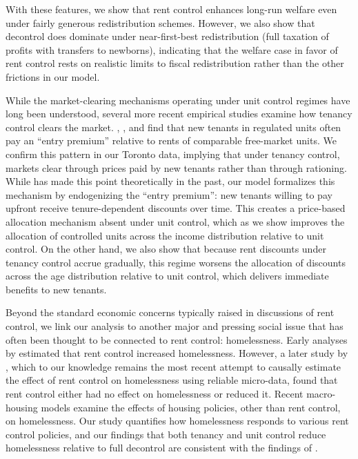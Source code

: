 \documentclass[parskip=full]{article}
\begin{document}
With these features, we show that rent control enhances long-run welfare even under fairly generous redistribution schemes. However, we also show that decontrol does dominate under near-first-best redistribution (full taxation of profits with transfers to newborns), indicating that the welfare case in favor of rent control rests on realistic limits to fiscal redistribution rather than the other frictions in our model.

While the market-clearing mechanisms operating under unit control regimes have long been understood, several more recent empirical studies examine how tenancy control clears the market. \citet{nagy-1997}, \citet{early-2000}, and \citet{cjq-2023} find that new tenants in regulated units often pay an ``entry premium'' relative to rents of comparable free-market units. We confirm this pattern in our Toronto data, implying that under tenancy control, markets clear through prices paid by new tenants rather than through rationing. While \citet{arnott-1995} has made this point theoretically in the past, our model formalizes this mechanism by endogenizing the ``entry premium'': new tenants willing to pay upfront receive tenure-dependent discounts over time. This creates a price-based allocation mechanism absent under unit control, which as we show improves the allocation of controlled units across the income distribution relative to unit control. On the other hand, we also show that because rent discounts under tenancy control accrue gradually, this regime worsens the allocation of discounts across the age distribution relative to unit control, which delivers immediate benefits to new tenants.

Beyond the standard economic concerns typically raised in discussions of rent control, we link our analysis to another major and pressing social issue that has often been thought to be connected to rent control: homelessness. Early analyses by \citet{tucker1987,tucker1989heritage,tucker1991cato,tucker1991public} estimated that rent control increased homelessness. However, a later study by \citet{eo-1998}, which to our knowledge remains the most recent attempt to causally estimate the effect of rent control on homelessness using reliable micro-data, found that rent control either had no effect on homelessness or reduced it. Recent macro-housing models \citep{az-2024, abramson-2024} examine the effects of housing policies, other than rent control, on homelessness. Our study quantifies how homelessness responds to various rent control policies, and our findings that both tenancy and unit control reduce homelessness relative to full decontrol are consistent with the findings of \citet{eo-1998}. 
\end{document}
